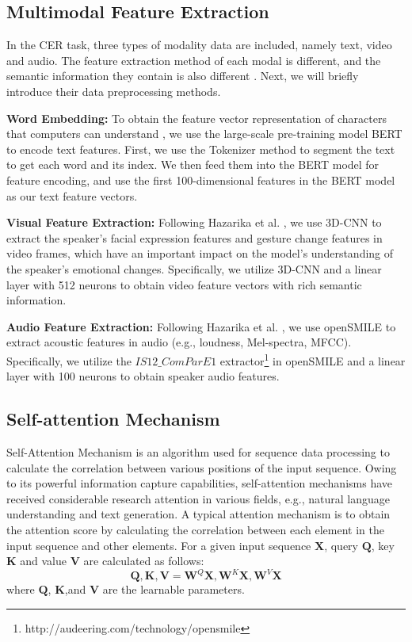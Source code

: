 {{\subsection{Multimodal Feature Extraction}
In the CER task, three types of modality data are included, namely text, video and audio. The feature extraction method of each modal is different, and the semantic information they contain is also different \cite{ghosh2022comma}. Next, we will briefly introduce their data preprocessing methods.

\textbf{Word Embedding:} To obtain the feature vector representation of characters that computers can understand \cite{schuster2022bert}, we use the large-scale pre-training model BERT to encode text features. First, we use the Tokenizer method to segment the text to get each word and its index. We then feed them into the BERT model for feature encoding, and use the first 100-dimensional features in the BERT model as our text feature vectors.

\textbf{Visual Feature Extraction:} Following Hazarika et al. \cite{hazarika2018conversational}, we use 3D-CNN to extract the speaker's facial expression features and gesture change features in video frames, which have an important impact on the model's understanding of the speaker's emotional changes. Specifically, we utilize 3D-CNN and a linear layer with 512 neurons to obtain video feature vectors with rich semantic information.

\textbf{Audio Feature Extraction:} Following Hazarika et al. \cite{hazarika2018conversational}, we use openSMILE \cite{eyben2010opensmile} to extract acoustic features in audio (e.g., loudness, Mel-spectra, MFCC). Specifically, we utilize the $IS12\_ComParE1$ extractor\footnote{ http://audeering.com/technology/opensmile}  in openSMILE and a linear layer with 100 neurons to obtain speaker audio features.

{\subsection{Self-attention Mechanism}}
{Self-Attention Mechanism is an algorithm used for sequence data processing to calculate the correlation between various positions of the input sequence. Owing to its powerful information capture capabilities, self-attention mechanisms have received considerable research attention in various fields, e.g., natural language understanding and text generation. A typical attention mechanism is to obtain the attention score by calculating the correlation between each element in the input sequence and other elements. For a given input sequence $\boldsymbol{X}$, query $\boldsymbol{Q}$, key $\boldsymbol{K}$ and value $\boldsymbol{V}$ are calculated as follows:}
\begin{equation}
    \boldsymbol{Q},\boldsymbol{K},\boldsymbol{V} = \boldsymbol{W}^Q\boldsymbol{X},\boldsymbol{W}^K\boldsymbol{X}, \boldsymbol{W}^V\boldsymbol{X}
\end{equation}
{where $\boldsymbol{Q}$, $\boldsymbol{K}$,and $\boldsymbol{V}$ are the learnable parameters.}

}}
